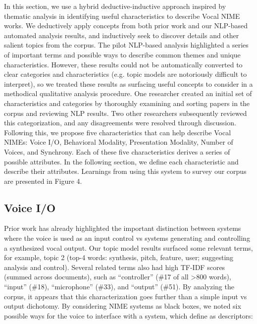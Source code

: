 \documentclass[sigconf]{nimeart}
\begin{document}
In this section, we use a hybrid deductive-inductive approach inspired by thematic analysis in identifying useful characteristics to describe Vocal NIME works. We deductively apply concepts from both prior work and our NLP-based automated analysis results, and inductively seek to discover details and other salient topics from the corpus. The pilot NLP-based analysis highlighted a series of important terms and possible ways to describe common themes and unique characteristics. However, these results could not be automatically converted to clear categories and characteristics (e.g. topic models are notoriously difficult to interpret), so we treated these results as surfacing useful concepts to consider in a methodical qualitative analysis procedure. One researcher created an initial set of characteristics and categories by thoroughly examining and sorting papers in the corpus and reviewing NLP results. Two other researchers subsequently reviewed this categorization, and any disagreements were resolved through discussion. Following this, we propose five characteristics that can help describe Vocal NIMEs: Voice I/O, Behavioral Modality, Presentation Modality, Number of Voices, and Synchrony. Each of these five characteristics derives a series of possible attributes. In the following section, we define each characteristic and describe their attributes. Learnings from using this system to survey our corpus are presented in Figure 4.~

\subsection{Voice I/O}\label{voice-io}

Prior work \cite{reed2020surface} has already highlighted the important distinction between systems where the voice is used as an input control vs systems generating and controlling a synthesized vocal output. Our topic model results surfaced some relevant terms, for example, topic 2 (top-4 words: synthesis, pitch, feature, user; suggesting analysis and control). Several related terms also had high TF-IDF scores (summed across documents), such as ``controller'' (\#17 of all \textgreater800 words), ``input'' (\#18), ``microphone'' (\#33), and ``output'' (\#51). By analyzing the corpus, it appears that this characterization goes further than a simple input vs output dichotomy. By considering NIME systems as black boxes, we noted six possible ways for the voice to interface with a system, which define as descriptors:
\end{document}

